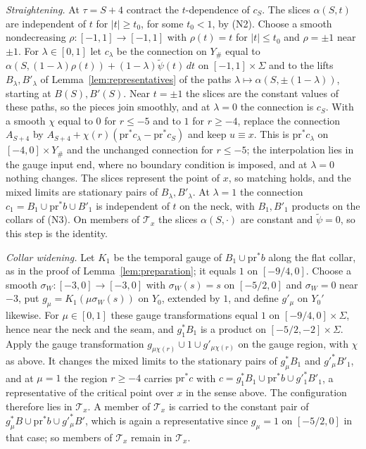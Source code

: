 \documentclass[11pt]{amsart}
\theoremstyle{definition}
\theoremstyle{remark}
\theoremstyle{plain}
\numberwithin{equation}{section}
\begin{document}
\emph{Straightening.} At $\tau=S+4$ contract the $t$-dependence of $c_S$. The
slices $\alpha(S,t)$ are independent of $t$ for $|t|\ge t_0$, for some $t_0<1$, by (N2).
Choose a smooth nondecreasing $\rho:[-1,1]\to[-1,1]$ with $\rho(t)=t$ for
$|t|\le t_0$ and $\rho=\pm1$ near $\pm1$. For $\lambda\in[0,1]$ let
$c_\lambda$ be the connection on $Y_\#$ equal to
$\alpha(S,(1-\lambda)\rho(t))+(1-\lambda)\widetilde\psi(t)\,dt$ on
$[-1,1]\times\Sigma$ and to the lifts $B_\lambda,B'_\lambda$ of
Lemma~\ref{lem:representatives} of the paths
$\lambda\mapsto\alpha(S,\pm(1-\lambda))$, starting at $B(S),B'(S)$. Near
$t=\pm1$ the slices are the constant values of these paths, so the pieces
join smoothly, and at $\lambda=0$ the connection is $c_S$. With a smooth
$\chi$ equal to $0$ for $r\le-5$ and to $1$ for $r\ge-4$, replace the
connection $A_{S+4}$ by
$A_{S+4}+\chi(r)(\mathrm{pr}^*c_\lambda-\mathrm{pr}^*c_S)$ and keep $u\equiv x$. This is
$\mathrm{pr}^*c_\lambda$ on $[-4,0]\times Y_\#$ and the unchanged connection for
$r\le-5$; the interpolation lies in the gauge input end, where no boundary
condition is imposed, and at $\lambda=0$ nothing changes. The slices
represent the point of $x$, so matching holds, and the mixed limits are
stationary pairs of $B_\lambda,B'_\lambda$. At $\lambda=1$ the connection
$c_1=B_1\cup\mathrm{pr}^*b\cup B'_1$ is independent of $t$ on the neck, with
$B_1,B'_1$ products on the collars of (N3). On members of $\mathcal T_x$ the
slices $\alpha(S,\cdot)$ are constant and $\widetilde\psi=0$, so this step is
the identity.

\emph{Collar widening.} Let $K_1$ be the temporal gauge of $B_1\cup\mathrm{pr}^*b$
along the flat collar, as in the proof of Lemma~\ref{lem:preparation}; it
equals $1$ on $[-9/4,0]$. Choose a smooth $\sigma_W:[-3,0]\to[-3,0]$ with
$\sigma_W(s)=s$ on $[-5/2,0]$ and $\sigma_W=0$ near $-3$, put
$g_\mu=K_1(\mu\sigma_W(s))$ on $Y_0$, extended by $1$, and define $g'_\mu$ on
$Y_0'$ likewise. For $\mu\in[0,1]$ these gauge transformations equal $1$ on
$[-9/4,0]\times\Sigma$, hence near the neck and the seam, and
$g_1^*B_1$ is a product on $[-5/2,-2]\times\Sigma$. Apply the gauge
transformation $g_{\mu\chi(r)}\cup1\cup g'_{\mu\chi(r)}$ on the gauge region,
with $\chi$ as above. It changes the mixed limits to the stationary pairs
of $g_\mu^*B_1$ and $g'^*_\mu B'_1$, and at $\mu=1$ the region $r\ge-4$
carries $\mathrm{pr}^*c$ with $c=g_1^*B_1\cup\mathrm{pr}^*b\cup g'^*_1B'_1$, a
representative of the critical point over $x$ in the sense above. The
configuration therefore lies in $\mathcal T_x$. A member of $\mathcal T_x$
is carried to the constant pair of $g_\mu^*B\cup\mathrm{pr}^*b\cup g'^*_\mu B'$,
which is again a representative since $g_\mu=1$ on $[-5/2,0]$ in that case;
so members of $\mathcal T_x$ remain in $\mathcal T_x$.
\end{document}
